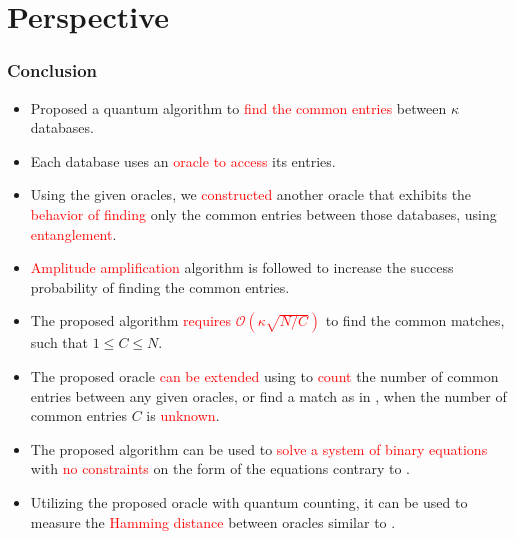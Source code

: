 \documentclass{beamer}
\begin{document}
\section{Perspective}
\begin{frame}[allowframebreaks]
\frametitle{Conclusion}

\begin{itemize}

\item Proposed a quantum algorithm to \textcolor{red}{find the common entries} between $\kappa$ databases.

\item Each database uses an \textcolor{red}{oracle to access} its entries.

\item Using the given oracles, we \textcolor{red}{constructed} another oracle that exhibits the \textcolor{red}{behavior of finding} only the common entries between those databases, using \textcolor{red}{entanglement}.


\item \textcolor{red}{Amplitude amplification} algorithm is followed to increase the success probability of finding the common entries.


\item The proposed algorithm \textcolor{red}{requires $\mathcal{O}(\kappa\sqrt{N/C})$} to find the common matches, such that $1\leq C\leq N$.


\item The proposed oracle \textcolor{red}{can be extended} using \cite{quant-count} to \textcolor{red}{count} the number of common entries between any given oracles, or find a match as in \cite{quant-tightbound-for-search,younes}, when the number of common entries $C$ is \textcolor{red}{unknown}.


\item The proposed algorithm can be used to \textcolor{red}{solve a system of binary equations} with \textcolor{red}{no constraints} on the form of the equations contrary to \cite{Schwabe}.


\item Utilizing the proposed oracle with quantum counting, it can be used to measure the \textcolor{red}{Hamming distance} between oracles similar to \cite{Xie2018,hamming-khaled}.

\end{itemize}



\end{frame}
\end{document}
